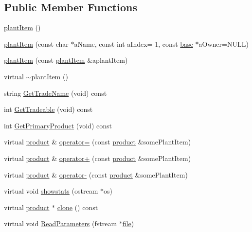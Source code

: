 \subsection*{Public Member Functions}
\begin{DoxyCompactItemize}
\item 
\hyperlink{classplant_item_ac93fe7d6cc8d879ed9d646769023c09e}{plantItem} ()
\item 
\hyperlink{classplant_item_a968d1e08695684a7e8a030a358ac6207}{plantItem} (const char $\ast$aName, const int aIndex=-\/1, const \hyperlink{classbase}{base} $\ast$aOwner=NULL)
\item 
\hyperlink{classplant_item_af4f30aea1be38af35207388520405d9b}{plantItem} (const \hyperlink{classplant_item}{plantItem} \&aplantItem)
\item 
virtual \hyperlink{classplant_item_a4e87de98904bd879da41009e546009fa}{$\sim$plantItem} ()
\item 
string \hyperlink{classplant_item_a13e0fffda4f4b06bf2227812e810197e}{GetTradeName} (void) const 
\item 
int \hyperlink{classplant_item_a699f90b4fdbccc1f533ebe40b6865c10}{GetTradeable} (void) const 
\item 
int \hyperlink{classplant_item_a0bce13899dbeeb3eb5be82d42ea9cf93}{GetPrimaryProduct} (void) const 
\item 
virtual \hyperlink{classproduct}{product} \& \hyperlink{classplant_item_a8f1788f9c6299d63ad1fa4add42c0fe2}{operator=} (const \hyperlink{classproduct}{product} \&somePlantItem)
\item 
virtual \hyperlink{classproduct}{product} \& \hyperlink{classplant_item_aee9a9da7f6a40551ff0e172561d6a881}{operator+} (const \hyperlink{classproduct}{product} \&somePlantItem)
\item 
virtual \hyperlink{classproduct}{product} \& \hyperlink{classplant_item_a3ca74628fd07b229a871ac0f80e31a41}{operator-\/} (const \hyperlink{classproduct}{product} \&somePlantItem)
\item 
virtual void \hyperlink{classplant_item_af4591feee9c292842152a6451d392d33}{showstats} (ostream $\ast$os)
\item 
virtual \hyperlink{classproduct}{product} $\ast$ \hyperlink{classplant_item_ae9aec44d433339eca078b4277801717a}{clone} () const 
\item 
virtual void \hyperlink{classplant_item_a6ed5a9408b471bb44246e5c50e93b72f}{ReadParameters} (fstream $\ast$\hyperlink{classbase_a3af52ee9891719d09b8b19b42450b6f6}{file})
\end{DoxyCompactItemize}
